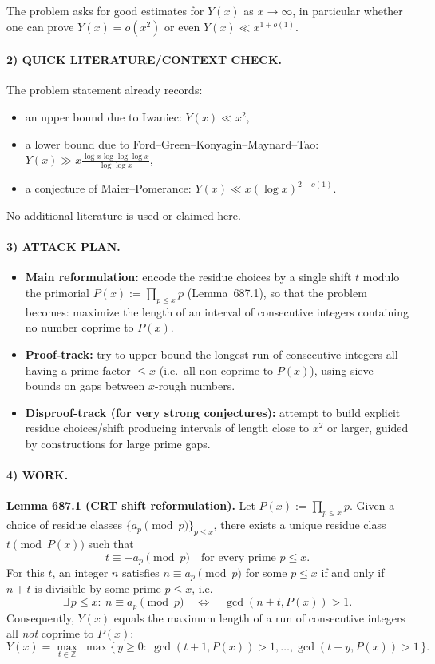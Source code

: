 The problem asks for good estimates for $Y(x)$ as $x\to\infty$, in particular whether one can prove $Y(x)=o(x^2)$
or even $Y(x)\ll x^{1+o(1)}$.

\paragraph{2) QUICK LITERATURE/CONTEXT CHECK.}
The problem statement already records:
\begin{itemize}
\item an upper bound due to Iwaniec: $Y(x)\ll x^2$,
\item a lower bound due to Ford--Green--Konyagin--Maynard--Tao: $Y(x)\gg x\frac{\log x\log\log\log x}{\log\log x}$,
\item a conjecture of Maier--Pomerance: $Y(x)\ll x(\log x)^{2+o(1)}$.
\end{itemize}
No additional literature is used or claimed here.

\paragraph{3) ATTACK PLAN.}
\begin{itemize}
\item \textbf{Main reformulation:} encode the residue choices by a single shift $t$ modulo the primorial $P(x):=\prod_{p\le x}p$ (Lemma~687.1),
so that the problem becomes: maximize the length of an interval of consecutive integers containing no number coprime to $P(x)$.
\item \textbf{Proof-track:} try to upper-bound the longest run of consecutive integers all having a prime factor $\le x$ (i.e.\ all non-coprime to $P(x)$),
using sieve bounds on gaps between $x$-rough numbers.
\item \textbf{Disproof-track (for very strong conjectures):} attempt to build explicit residue choices/shift producing intervals of length close to $x^2$
or larger, guided by constructions for large prime gaps.
\end{itemize}

\paragraph{4) WORK.}
\medskip
\noindent\textbf{Lemma 687.1 (CRT shift reformulation).}
Let $P(x):=\prod_{p\le x}p$.
Given a choice of residue classes $\{a_p\pmod p\}_{p\le x}$, there exists a unique residue class $t\pmod{P(x)}$ such that
\[
t\equiv -a_p \pmod p\quad\text{for every prime }p\le x.
\]
For this $t$, an integer $n$ satisfies $n\equiv a_p\pmod p$ for some $p\le x$ if and only if $n+t$ is divisible by some prime $p\le x$, i.e.
\[
\exists\,p\le x:\ n\equiv a_p\pmod p\quad\Longleftrightarrow\quad \gcd(n+t,P(x))>1.
\]
Consequently, $Y(x)$ equals the maximum length of a run of consecutive integers all \emph{not} coprime to $P(x)$:
\[
Y(x)=\max_{t\in\mathbb Z}\ \max\{\,y\ge 0:\ \gcd(t+1,P(x))>1,\dots,\gcd(t+y,P(x))>1\,\}.
\]

